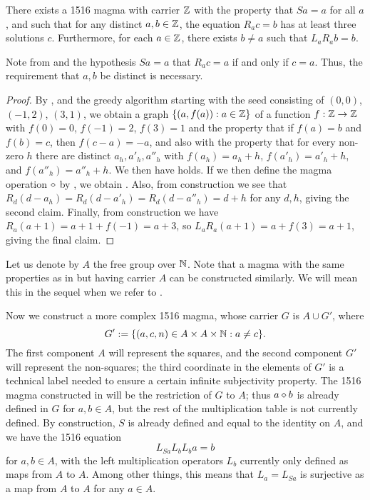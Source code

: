 \begin{corollary}\label{1516-base} There exists a 1516 magma with carrier $\mathbb{Z}$ with the property that $Sa=a$ for all $a$, and such that for any distinct $a,b \in \mathbb{Z}$, the equation $R_a c = b$ has at least three solutions $c$.  Furthermore, for each $a \in \mathbb{Z}$, there exists $b \neq a$ such that $L_a R_a b = b$.
\end{corollary}

Note from  and the hypothesis $Sa=a$ that $R_a c = a$ if and only if $c=a$.  Thus, the requirement that $a,b$ be distinct is necessary.

\begin{proof}  By ,  and the greedy algorithm starting with the seed consisting of $(0,0)$, $(-1,2)$, $(3,1)$, we obtain a graph $\{ (a,f(a)): a \in \mathbb{Z} \}$ of a function $f:\mathbb{Z} \to \mathbb{Z}$ with $f(0)=0$, $f(-1)=2$, $f(3)=1$ and the property that if $f(a)=b$ and $f(b)=c$, then $f(c-a)=-a$, and also with the property that for every non-zero $h$ there are distinct $a_h, a'_h, a''_h$ with $f(a_h)=a_h+h$, $f(a'_h) = a'_h+h$, and $f(a''_h) = a''_h+h$.  We then have  holds.  If we then define the magma operation $\diamond$ by , we obtain .  Also, from construction we see that $R_d (d - a_h) = R_d (d - a'_h) = R_d (d - a''_h) = d+h$ for any $d,h$, giving the second claim.  Finally, from construction we have $R_a (a+1) = a+1+f(-1) = a+3$, so $L_a R_a (a+1) = a + f(3) = a+1$, giving the final claim.
\end{proof}

Let us denote by $A$ the free group over $\mathbb{N}$. Note that a magma with the same properties as in  but having carrier $A$ can be constructed similarly. We will mean this in the sequel when we refer to .

Now we construct a more complex 1516 magma, whose carrier $G$ is $A \cup G'$, where
$$G' := \{ (a,c,n) \in A \times A \times \mathbb{N} : a \neq c\}.$$
The first component $A$ will represent the squares, and the second component $G'$ will represent the non-squares; the third coordinate in the elements of $G'$ is a technical label needed to ensure a certain infinite subjectivity property.  The 1516 magma constructed in  will be the restriction of $G$ to $A$; thus $a \diamond b$ is already defined in $G$ for $a,b \in A$, but the rest of the multiplication table is not currently defined.  By construction, $S$ is already defined and equal to the identity on $A$, and we have the 1516 equation
$$ L_{Sa} L_b L_b a = b$$
for $a,b \in A$, with the left multiplication operators $L_b$ currently only defined as maps from $A$ to $A$.  Among other things, this means that $L_a = L_{Sa}$ is surjective as a map from $A$ to $A$ for any $a \in A$.

